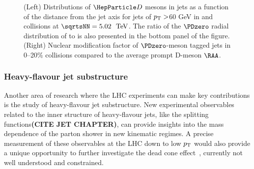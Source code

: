 \begin{figure}
\caption{(Left) Distributions of $\PD$ mesons in jets as a function of the distance from the jet axis for jets of $p\sb{\scriptstyle\mathrm{T}}>$60 GeV in \pp and \PbPb collisions at $\sqrtsNN=5.02~{\UTeV}$. The ratio of the $\PDzero$ radial distribution of \PbPb to \pp is also presented in the bottom panel of the figure. (Right) Nuclear modification factor of $\PDzero$-meson tagged jets in 0--20$\%$ \PbPb collisions compared to the average prompt D-meson $\RAA$.}
\label{fig:DjetCMS}
\end {figure}

\subsubsection{Heavy-flavour jet substructure}

Another area of research where the LHC experiments can make key contributions is the study of heavy-flavour jet substructure. New experimental observables related to the inner structure of heavy-flavour jets, like the splitting functions\textbf{(CITE JET CHAPTER)}, can provide insights into the mass dependence of the parton shower in new kinematic regimes. A precise measurement of these observables at the LHC down to low $p\sb{\scriptstyle\mathrm{T}}$ would also provide a unique opportunity to further investigate the dead cone effect~\cite{DOKSHITZER2001199}, currently not well understood and constrained.

